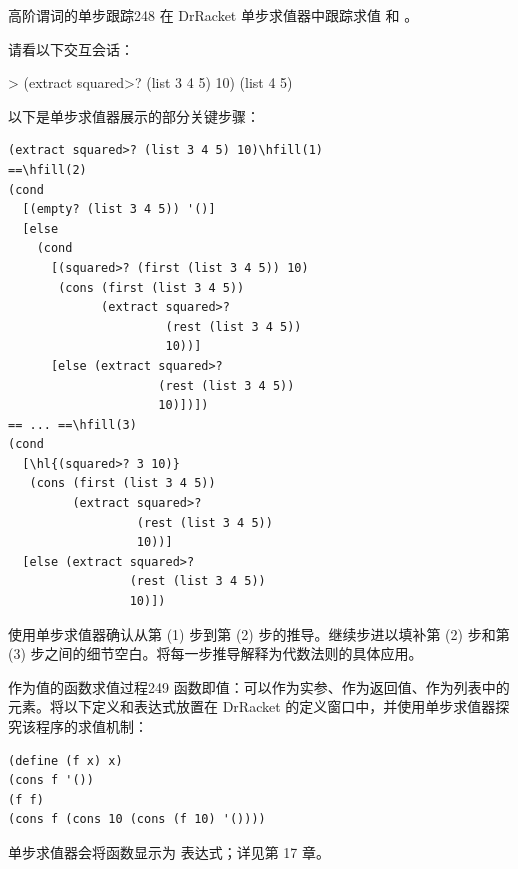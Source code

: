 \begin{exercise}{高阶谓词的单步跟踪}{248}
在 DrRacket 单步求值器中跟踪求值  和 。

请看以下交互会话：
\begin{replbox}
> (extract squared>? (list 3 4 5) 10)
(list 4 5)
\end{replbox}

以下是单步求值器展示的部分关键步骤：

\begin{stepperbox}
\begin{Verbatim}[commandchars=\\\{\}, fontsize=\scriptsize]
(extract squared>? (list 3 4 5) 10)\hfill(1)
==\hfill(2)
(cond
  [(empty? (list 3 4 5)) '()]
  [else
    (cond
      [(squared>? (first (list 3 4 5)) 10)
       (cons (first (list 3 4 5))
             (extract squared>?
                      (rest (list 3 4 5))
                      10))]
      [else (extract squared>?
                     (rest (list 3 4 5))
                     10)])])
== ... ==\hfill(3)
(cond
  [\hl{(squared>? 3 10)}
   (cons (first (list 3 4 5))
         (extract squared>?
                  (rest (list 3 4 5))
                  10))]
  [else (extract squared>?
                 (rest (list 3 4 5))
                 10)])
\end{Verbatim}
\end{stepperbox}

使用单步求值器确认从第 (1) 步到第 (2) 步的推导。继续步进以填补第 (2) 步和第 (3) 步之间的细节空白。将每一步推导解释为代数法则的具体应用。
\end{exercise}

\begin{exercise}{作为值的函数求值过程}{249}
函数即值：可以作为实参、作为返回值、作为列表中的元素。将以下定义和表达式放置在 DrRacket 的定义窗口中，并使用单步求值器探究该程序的求值机制：

\begin{lstlisting}[language=BSL]
(define (f x) x)
(cons f '())
(f f)
(cons f (cons 10 (cons (f 10) '())))
\end{lstlisting}

单步求值器会将函数显示为  表达式；详见第 17 章。
\end{exercise}
